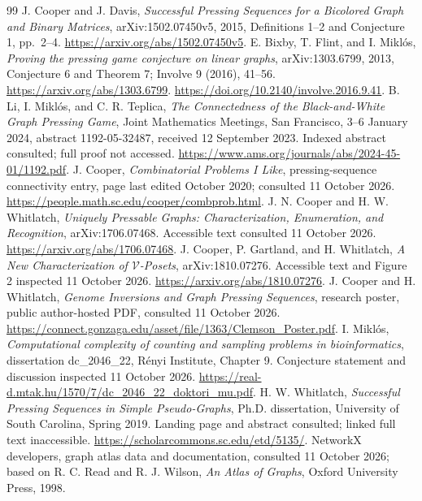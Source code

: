 \documentclass[11pt]{article}
\begin{document}
\begin{thebibliography}{99}
 J. Cooper and J. Davis,
\emph{Successful Pressing Sequences for a Bicolored Graph and Binary Matrices},
arXiv:1502.07450v5, 2015, Definitions 1--2 and Conjecture 1, pp.~2--4.
\url{https://arxiv.org/abs/1502.07450v5}.
 E. Bixby, T. Flint, and I. Mikl\'os,
\emph{Proving the pressing game conjecture on linear graphs},
arXiv:1303.6799, 2013, Conjecture 6 and Theorem 7;
Involve 9 (2016), 41--56.
\url{https://arxiv.org/abs/1303.6799}.
\url{https://doi.org/10.2140/involve.2016.9.41}.
 B. Li, I. Mikl\'os, and C. R. Teplica,
\emph{The Connectedness of the Black-and-White Graph Pressing Game},
Joint Mathematics Meetings, San Francisco, 3--6 January 2024,
abstract 1192-05-32487, received 12 September 2023.
Indexed abstract consulted; full proof not accessed.
\url{https://www.ams.org/journals/abs/2024-45-01/1192.pdf}.
 J. Cooper, \emph{Combinatorial Problems I Like},
pressing-sequence connectivity entry, page last edited October 2020;
consulted 11 October 2026.
\url{https://people.math.sc.edu/cooper/combprob.html}.
 J. N. Cooper and H. W. Whitlatch,
\emph{Uniquely Pressable Graphs: Characterization, Enumeration, and Recognition},
arXiv:1706.07468. Accessible text consulted 11 October 2026.
\url{https://arxiv.org/abs/1706.07468}.
 J. Cooper, P. Gartland, and H. Whitlatch,
\emph{A New Characterization of $\mathcal V$-Posets},
arXiv:1810.07276. Accessible text and Figure 2 inspected 11 October 2026.
\url{https://arxiv.org/abs/1810.07276}.
 J. Cooper and H. Whitlatch,
\emph{Genome Inversions and Graph Pressing Sequences}, research poster,
public author-hosted PDF, consulted 11 October 2026.
\url{https://connect.gonzaga.edu/asset/file/1363/Clemson_Poster.pdf}.
 I. Mikl\'os,
\emph{Computational complexity of counting and sampling problems in bioinformatics},
dissertation dc\_2046\_22, R\'enyi Institute, Chapter 9.
Conjecture statement and discussion inspected 11 October 2026.
\url{https://real-d.mtak.hu/1570/7/dc_2046_22_doktori_mu.pdf}.
 H. W. Whitlatch,
\emph{Successful Pressing Sequences in Simple Pseudo-Graphs},
Ph.D. dissertation, University of South Carolina, Spring 2019.
Landing page and abstract consulted; linked full text inaccessible.
\url{https://scholarcommons.sc.edu/etd/5135/}.
 NetworkX developers, graph atlas data and documentation,
consulted 11 October 2026; based on R. C. Read and R. J. Wilson,
\emph{An Atlas of Graphs}, Oxford University Press, 1998.

\end{thebibliography}
\end{document}
